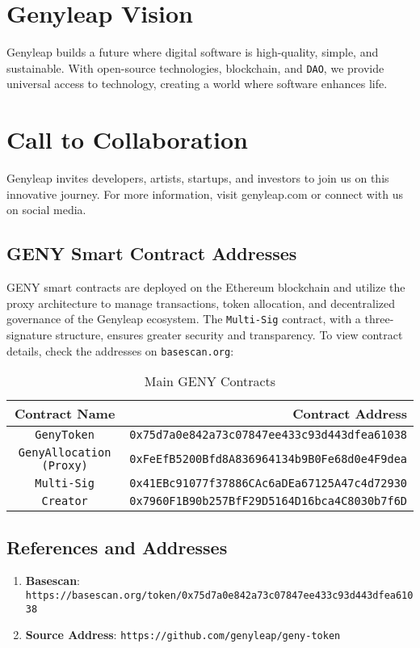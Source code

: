 \documentclass[a4paper,12pt,openany]{book}
\begin{document}
\chapter{Genyleap Vision}
Genyleap builds a future where digital software is high-quality, simple, and sustainable. With open-source technologies, blockchain, and \texttt{DAO}, we provide universal access to technology, creating a world where software enhances life.

\chapter{Call to Collaboration}
Genyleap invites developers, artists, startups, and investors to join us on this innovative journey. For more information, visit genyleap.com or connect with us on social media.

\section*{GENY Smart Contract Addresses}
GENY smart contracts are deployed on the Ethereum blockchain and utilize the  proxy architecture to manage transactions, token allocation, and decentralized governance of the Genyleap ecosystem. The \texttt{Multi-Sig} contract, with a three-signature structure, ensures greater security and transparency. To view contract details, check the addresses on \texttt{basescan.org}:

\begin{table}[h]
\centering
\caption*{Main GENY Contracts}
\small
\begin{tabular}{c r}
\hline
\textbf{Contract Name} & \textbf{Contract Address} \\
\hline
\texttt{GenyToken} & {\texttt{0x75d7a0e842a73c07847ee433c93d443dfea61038}} \\
\texttt{GenyAllocation (Proxy)} & {\texttt{0xFeEfB5200Bfd8A836964134b9B0Fe68d0e4F9dea}} \\
\texttt{Multi-Sig} & {\texttt{0x41EBc91077f37886CAc6aDEa67125A47c4d72930}} \\
\texttt{Creator} & {\texttt{0x7960F1B90b257BfF29D5164D16bca4C8030b7f6D}} \\
\hline
\end{tabular}
\end{table}

\section*{References and Addresses}

\begin{enumerate}
    \item \textbf{Basescan}: \texttt{https://basescan.org/token/0x75d7a0e842a73c07847ee433c93d443dfea61038}
    \item \textbf{Source Address}: \texttt{https://github.com/genyleap/geny-token}
\end{enumerate}
\end{document}
